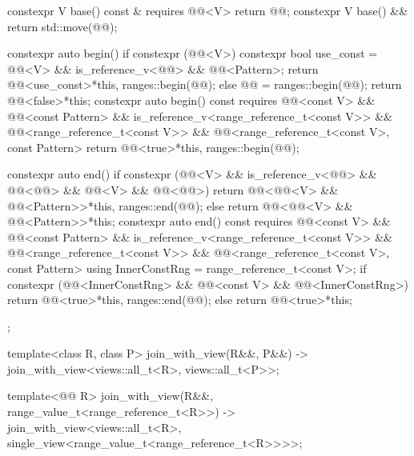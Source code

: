 \begin{codeblock}
{{    constexpr V base() const & requires @@<V> { return @@; }
    constexpr V base() && { return std::move(@@); }

    constexpr auto begin() {
      if constexpr (@@<V>) {
        constexpr bool use_const =
          @@<V> && is_reference_v<@@> && @@<Pattern>;
        return @@<use_const>{*this, ranges::begin(@@)};
      }
      else {
        @@ = ranges::begin(@@);
        return @@<false>{*this};
      }
    }
    constexpr auto begin() const
      requires @@<const V> &&
               @@<const Pattern> &&
               is_reference_v<range_reference_t<const V>> &&
               @@<range_reference_t<const V>> &&
               @@<range_reference_t<const V>, const Pattern> {
      return @@<true>{*this, ranges::begin(@@)};
    }

    constexpr auto end() {
      if constexpr (@@<V> &&
                    is_reference_v<@@> && @@<@@> &&
                    @@<V> && @@<@@>)
        return @@<@@<V> && @@<Pattern>>{*this, ranges::end(@@)};
      else
        return @@<@@<V> && @@<Pattern>>{*this};
    }
    constexpr auto end() const
      requires @@<const V> && @@<const Pattern> &&
               is_reference_v<range_reference_t<const V>> &&
               @@<range_reference_t<const V>> &&
               @@<range_reference_t<const V>, const Pattern> {
      using InnerConstRng = range_reference_t<const V>;
      if constexpr (@@<InnerConstRng> &&
                    @@<const V> && @@<InnerConstRng>)
        return @@<true>{*this, ranges::end(@@)};
      else
        return @@<true>{*this};
    }
  };

  template<class R, class P>
    join_with_view(R&&, P&&) -> join_with_view<views::all_t<R>, views::all_t<P>>;

  template<@@ R>
    join_with_view(R&&, range_value_t<range_reference_t<R>>)
      -> join_with_view<views::all_t<R>, single_view<range_value_t<range_reference_t<R>>>>;
}
\end{codeblock}

